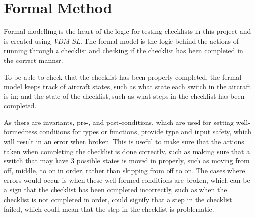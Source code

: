 \documentclass[../dissertation.tex]{subfiles}
\begin{document}
\section{Formal Method}
Formal modelling is the heart of the logic for testing checklists in this project
and is created using \textit{VDM-SL}.
The formal model is the logic behind the actions of running through a checklist
and checking if the checklist has been completed in the correct manner.

To be able to check that the checklist has been properly completed,
the formal model keeps track of aircraft states, such as what state each switch
in the aircraft is in; and the state of the checklist, such as what steps in the
checklist has been completed.

As there are invariants, pre-, and post-conditions, which are used for setting
well-formedness conditions for types or functions, provide type and input safety,
which will result in an error when broken. This is useful to make sure that
the actions taken when completing the checklist is done correctly, such as making
sure that a switch that may have 3 possible states is moved in properly, such as
moving from off, middle, to on in order, rather than skipping from off to on.
The cases where errors would occur is when these well-formed conditions are broken,
which can be a sign that the checklist has been completed incorrectly, such as
when the checklist is not completed in order, could signify that a step in the checklist
failed, which could mean that the step in the checklist is problematic.
\end{document}
